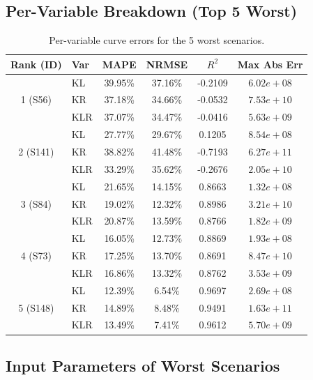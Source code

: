 \documentclass[11pt,a4paper]{article}
\begin{document}
\subsection{Per-Variable Breakdown (Top 5 Worst)}

\begin{table}[h]
\centering
\caption{Per-variable curve errors for the 5 worst scenarios.}
\begin{tabular}{clcccc}
\toprule
\textbf{Rank (ID)} & \textbf{Var} & \textbf{MAPE} & \textbf{NRMSE} &
\textbf{$R^2$} & \textbf{Max Abs Err} \\
\midrule
    \multirow{3}{*}{1 (S56)} & KL & 39.95\% & 37.16\% & -0.2109 & $6.02e+08$ \\
     & KR & 37.18\% & 34.66\% & -0.0532 & $7.53e+10$ \\
     & KLR & 37.07\% & 34.47\% & -0.0416 & $5.63e+09$ \\
    \hline
    \multirow{3}{*}{2 (S141)} & KL & 27.77\% & 29.67\% & 0.1205 & $8.54e+08$ \\
     & KR & 38.82\% & 41.48\% & -0.7193 & $6.27e+11$ \\
     & KLR & 33.29\% & 35.62\% & -0.2676 & $2.05e+10$ \\
    \hline
    \multirow{3}{*}{3 (S84)} & KL & 21.65\% & 14.15\% & 0.8663 & $1.32e+08$ \\
     & KR & 19.02\% & 12.32\% & 0.8986 & $3.21e+10$ \\
     & KLR & 20.87\% & 13.59\% & 0.8766 & $1.82e+09$ \\
    \hline
    \multirow{3}{*}{4 (S73)} & KL & 16.05\% & 12.73\% & 0.8869 & $1.93e+08$ \\
     & KR & 17.25\% & 13.70\% & 0.8691 & $8.47e+10$ \\
     & KLR & 16.86\% & 13.32\% & 0.8762 & $3.53e+09$ \\
    \hline
    \multirow{3}{*}{5 (S148)} & KL & 12.39\% & 6.54\% & 0.9697 & $2.69e+08$ \\
     & KR & 14.89\% & 8.48\% & 0.9491 & $1.63e+11$ \\
     & KLR & 13.49\% & 7.41\% & 0.9612 & $5.70e+09$ \\
    \hline
\bottomrule
\end{tabular}
\label{tab:worst5_detail}
\end{table}

\subsection{Input Parameters of Worst Scenarios}
\end{document}
